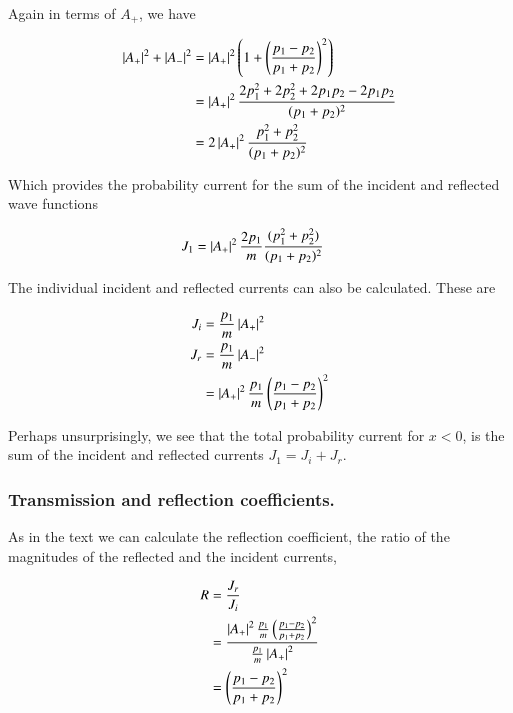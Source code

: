 \documentclass{article}
\begin{document}
Again in terms of $A_{+}$, we have

\begin{align*}
\left\lvert{A_{+} }\right\rvert^2 +\left\lvert{A_{-} }\right\rvert^2
&=
\left\lvert{A_{+}}\right\rvert^2 \left( 1 + \left( \frac{ p_1 - p_2 }{p_1 + p_2} \right)^2 \right) \\
&=
\left\lvert{A_{+}}\right\rvert^2
\frac{ 2 p_1^2 + 2 p_2^2 + 2 p_1 p_2 - 2 p_1 p_2 }{(p_1 + p_2)^2} \\
&=
2 \left\lvert{A_{+}}\right\rvert^2 \frac{ p_1^2 + p_2^2 }{(p_1 + p_2)^2} \\
\end{align*}

Which provides the probability current for the sum of the incident and reflected wave functions

\begin{align}\label{eqn:current1}
J_1
&=
\left\lvert{A_{+}}\right\rvert^2
\frac{2 p_1}{m}
\frac{ (p_1^2 + p_2^2) }{(p_1 + p_2)^2}
\end{align}

The individual incident and reflected currents can also be calculated.  These are

\begin{align*}
J_i &= \frac{ p_1}{m} \left\lvert{ A_{+} }\right\rvert^2 \\
J_r &= \frac{ p_1}{m} \left\lvert{ A_{-} }\right\rvert^2  \\
&=
\left\lvert{ A_{+} }\right\rvert^2
\frac{ p_1 }{m }
\left( \frac{ p_1 - p_2 }{p_1 + p_2} \right)^2
\end{align*}

Perhaps unsurprisingly, we see that the total probability current for $x<0$, is the sum of the incident and reflected
currents $J_1 = J_i + J_r$.

\subsubsection{ Transmission and reflection coefficients. }

As in the text we can calculate the reflection coefficient, the ratio of the magnitudes of the reflected and the incident currents,

\begin{align*}
R
&= \frac{J_r}{J_i}  \\
&=
\frac{\left\lvert{ A_{+} }\right\rvert^2
\frac{ p_1 }{m }
\left( \frac{ p_1 - p_2 }{p_1 + p_2} \right)^2 }{
\frac{ p_1}{m}
\left\lvert{ A_{+} }\right\rvert^2 } \\
&=
\left( \frac{ p_1 - p_2 }{p_1 + p_2} \right)^2
\\
\end{align*}
\end{document}
